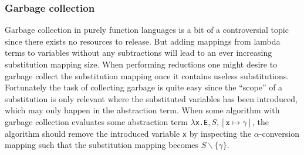 \documentclass[11pt,oneside,a4paper]{report}
\begin{document}
\subsubsection{Garbage collection}
Garbage collection in purely function languages is a bit of a controversial topic since there exists no resources to release.
But adding mappings from lambda terms to variables without any subtractions will lead to an ever increasing substitution mapping size.
When performing reductions one might desire to garbage collect the substitution mapping once it contains useless substitutions.
Fortunately the task of collecting garbage is quite easy since the ``scope'' of a substitution is only relevant where the substituted variables has been introduced, which may only happen in the abstraction term.
When some algorithm with garbage collection evaluates some abstraction term \texttt{$\lambda$x.E}$,S,[\texttt{x} \mapsto \gamma]$, the algorithm should remove the introduced variable \texttt{x} by inspecting the $\alpha$-conversion mapping such that the substitution mapping becomes $S\backslash \{ \gamma \}$.
\end{document}
